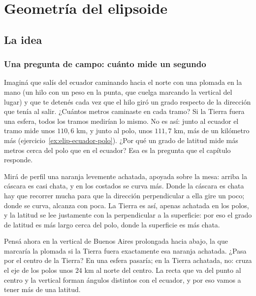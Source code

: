 \chapter{Geometría del elipsoide}\label{cap:elipsoide}

\section{La idea}

\subsection{Una pregunta de campo: cuánto mide un segundo}

Imaginá que salís del ecuador caminando hacia el norte con una plomada en la mano (un hilo con
un peso en la punta, que cuelga marcando la vertical del lugar) y que te detenés cada vez que el
hilo giró un grado respecto de la dirección que tenía al salir. ¿Cuántos metros caminaste en cada tramo?
Si la Tierra fuera una esfera, todos los tramos medirían lo mismo. No es así: junto al ecuador
el tramo mide unos \(110{,}6\) km, y junto al polo, unos \(111{,}7\) km, más de un kilómetro más
(ejercicio~\ref{ex:elip-ecuador-polo}). ¿Por qué un grado de latitud mide más metros cerca del
polo que en el ecuador? Esa es la pregunta que el capítulo responde.

Mirá de perfil una naranja levemente achatada, apoyada sobre la mesa: arriba la cáscara es
casi chata, y en los costados se curva más. Donde la cáscara es chata hay que recorrer mucha
para que la dirección perpendicular a ella gire un poco; donde se curva, alcanza con poca. La
Tierra es así, apenas achatada en los polos, y la latitud se lee justamente con la
perpendicular a la superficie: por eso el grado de latitud es más largo cerca del polo, donde la
superficie es más chata.

Pensá ahora en la vertical de Buenos Aires prolongada hacia abajo, la que marcaría la plomada
si la Tierra fuera exactamente esa naranja achatada. ¿Pasa por el centro de la Tierra? En una
esfera pasaría; en la Tierra achatada, no: cruza el eje de los polos unos \(24\) km al norte
del centro. La recta que va
del punto al centro y la vertical forman ángulos distintos con el ecuador, y por eso vamos a
tener más de una latitud.

